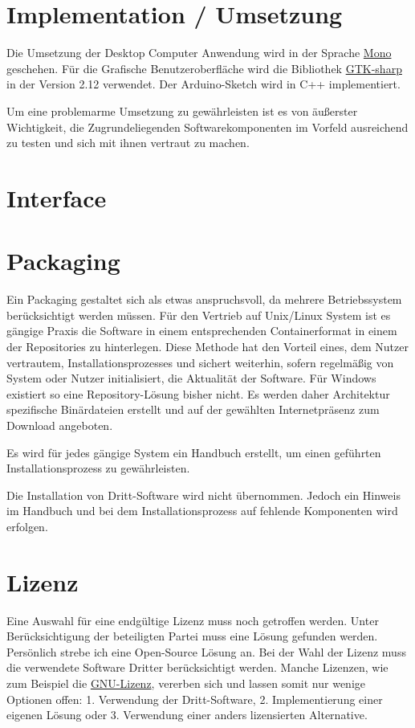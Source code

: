 \section{Implementation / Umsetzung}
Die Umsetzung der Desktop Computer Anwendung wird in der Sprache \href{http://www.mono-project.com/}{Mono} geschehen. Für die Grafische Benutzeroberfläche wird die Bibliothek \href{http://www.gtk.org/}{GTK-sharp} in der Version 2.12 verwendet. Der Arduino-Sketch wird in C++ implementiert.

Um eine problemarme Umsetzung zu gewährleisten ist es von äußerster Wichtigkeit, die Zugrundeliegenden Softwarekomponenten im Vorfeld ausreichend zu testen und sich mit ihnen vertraut zu machen. 
\section{Interface}
\section{Packaging}
Ein Packaging gestaltet sich als etwas anspruchsvoll, da mehrere Betriebssystem berücksichtigt werden müssen. Für den Vertrieb auf Unix/Linux System ist es gängige Praxis die Software in einem entsprechenden Containerformat in einem der Repositories zu hinterlegen. Diese Methode hat den Vorteil eines, dem Nutzer vertrautem, Installationsprozesses und sichert weiterhin, sofern regelmäßig von System oder Nutzer initialisiert, die Aktualität der Software. 
Für Windows existiert so eine Repository-Lösung bisher nicht. Es werden daher Architektur spezifische Binärdateien erstellt und auf der gewählten Internetpräsenz zum Download angeboten. 

Es wird für jedes gängige System ein Handbuch erstellt, um einen geführten Installationsprozess zu gewährleisten.

Die Installation von Dritt-Software wird nicht übernommen. Jedoch ein Hinweis im Handbuch und bei dem Installationsprozess auf fehlende Komponenten wird erfolgen.
\section{Lizenz}
Eine Auswahl für eine endgültige Lizenz muss noch getroffen werden. Unter Berücksichtigung der beteiligten Partei muss eine Lösung gefunden werden. Persönlich strebe ich eine Open-Source Lösung an.
Bei der Wahl der Lizenz muss die verwendete Software Dritter berücksichtigt werden. Manche Lizenzen, wie zum Beispiel die \href{https://www.gnu.org/licenses/licenses.html#GPL}{GNU-Lizenz}, vererben sich und lassen somit nur wenige Optionen offen: 1. Verwendung der Dritt-Software, 2. Implementierung einer eigenen Lösung oder 3. Verwendung einer anders lizensierten Alternative.
